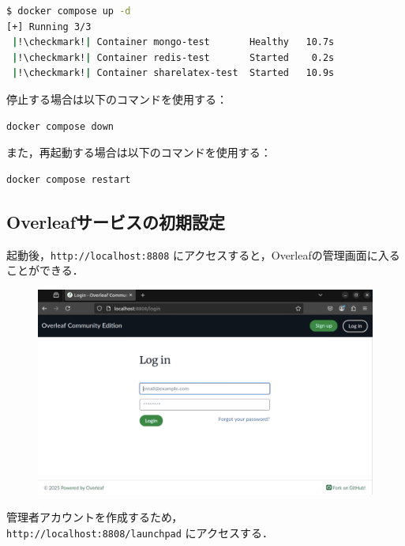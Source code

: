 \begin{lstlisting}[language=bash]
$ docker compose up -d
[+] Running 3/3
 |!\checkmark!| Container mongo-test       Healthy   10.7s
 |!\checkmark!| Container redis-test       Started    0.2s
 |!\checkmark!| Container sharelatex-test  Started   10.9s
\end{lstlisting}

停止する場合は以下のコマンドを使用する：

\begin{lstlisting}[language=bash]
docker compose down
\end{lstlisting}

また，再起動する場合は以下のコマンドを使用する：

\begin{lstlisting}[language=bash]
docker compose restart
\end{lstlisting}

\subsection{Overleafサービスの初期設定}

起動後，\texttt{http://localhost:8808} にアクセスすると，Overleafの管理画面に入ることができる．

\begin{figure}[H]
    \centering
    \includegraphics[width=0.8\linewidth]{images/Pasted image 20250307155416.png}
\end{figure}

管理者アカウントを作成するため，\\ \texttt{http://localhost:8808/launchpad} にアクセスする．

